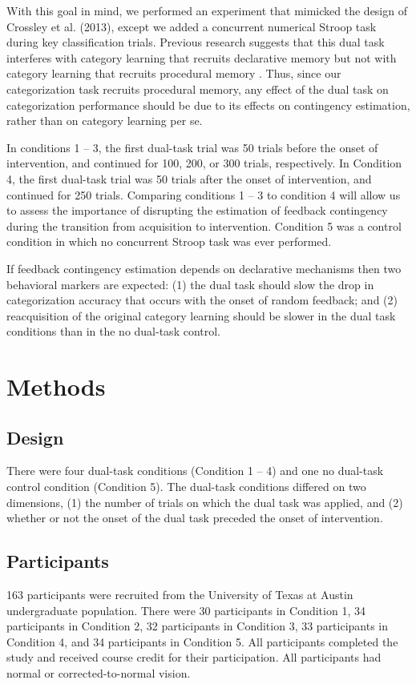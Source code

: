 \documentclass[man,apacite,draftfirst]{apa6} \usepackage{amsmath}
\begin{document}
With this goal in mind, we performed an experiment that mimicked the design of
Crossley et al. (2013), except we added a concurrent numerical Stroop task
during key classification trials. Previous research suggests that this dual task
interferes with category learning that recruits declarative memory but not with
category learning that recruits procedural memory \cite{WaldronAshby2001}. Thus,
since our categorization task recruits procedural memory, any effect of the dual
task on categorization performance should be due to its effects on contingency
estimation, rather than on category learning per se.

In conditions 1 -- 3, the first dual-task trial was 50 trials before the onset
of intervention, and continued for 100, 200, or 300 trials, respectively. In
Condition 4, the first dual-task trial was 50 trials after the onset of
intervention, and continued for 250 trials. Comparing conditions 1 -- 3 to
condition 4 will allow us to assess the importance of disrupting the estimation
of feedback contingency during the transition from acquisition to intervention.
Condition 5 was a control condition in which no concurrent Stroop task was ever
performed.

If feedback contingency estimation depends on declarative mechanisms then two
behavioral markers are expected: (1) the dual task should slow the drop in
categorization accuracy that occurs with the onset of random feedback; and (2)
reacquisition of the original category learning should be slower in the dual
task conditions than in the no dual-task control.

\section*{Methods}
\subsection*{Design} There were four dual-task conditions (Condition 1 -- 4) and
one no dual-task control condition (Condition 5). The dual-task conditions
differed on two dimensions, (1) the number of trials on which the dual task was
applied, and (2) whether or not the onset of the dual task preceded the onset of
intervention.

\subsection*{Participants} 163 participants were recruited from the University
of Texas at Austin undergraduate population. There were 30 participants in
Condition 1, 34 participants in Condition 2, 32 participants in Condition 3, 33
participants in Condition 4, and 34 participants in Condition 5. All
participants completed the study and received course credit for their
participation. All participants had normal or corrected-to-normal vision.
\end{document}
